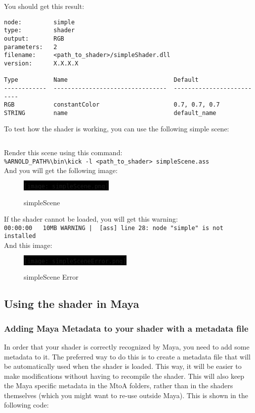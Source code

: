 You should get this result:
{\footnotesize \begin{verbatim}
node:         simple
type:         shader
output:       RGB
parameters:   2
filename:     <path_to_shader>/simpleShader.dll
version:      X.X.X.X

Type          Name                              Default
------------  --------------------------------  --------------------------
RGB           constantColor                     0.7, 0.7, 0.7
STRING        name                              default_name
\end{verbatim}}


To test how the shader is working, you can use the following simple scene:

\inputminted[mathescape,
linenos,
numbersep=5pt,
frame=lines,
framesep=2mm,
baselinestretch=1,
fontsize=\footnotesize,
tabsize=3,
label=simpleScene.ass]
{ass}{simpleScene.ass}

Render this scene using this command:\\
\verb|%ARNOLD_PATH%\bin\kick -l <path_to_shader> simpleScene.ass|\\

And you will get the following image:
\begin{figure}[H]
\centering
\colorbox{black}{\texttt{[image: simpleScene.png]}}
\caption{simpleScene}
\label{simpleScene.png}
\end{figure}

If the shader cannot be loaded, you will get this warning:\\
{\footnotesize \verb=00:00:00   10MB WARNING |  [ass] line 28: node "simple" is not installed=}\\
And this image:
\begin{figure}[H]
\centering
\colorbox{black}{\texttt{[image: simpleSceneError.png]}}
\caption{simpleScene Error}
\label{simpleSceneError.png}
\end{figure}

\subsection{Using the shader in Maya}

\subsubsection{Adding Maya Metadata to your shader with a metadata file}
In order that your shader is correctly recognized by Maya, you need to add some metadata to it.
The preferred way to do this is to create a metadata file that will be automatically used when the shader is loaded.
This way, it will be easier to make modifications without having to recompile the shader.
This will also keep the Maya specific metadata in the MtoA folders, rather than in the shaders themselves (which you might want to re-use outside Maya).
This is shown in the following code:

